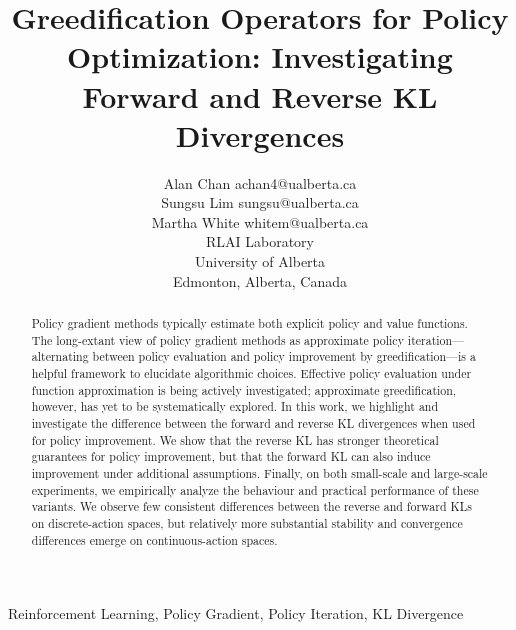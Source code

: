 \documentclass[twoside,11pt]{article}
\begin{document}
\title{Greedification Operators for Policy Optimization: Investigating Forward and Reverse KL Divergences}

\author{\name Alan Chan \email achan4@ualberta.ca \\
        \name Sungsu Lim \email sungsu@ualberta.ca \\
        \name Martha White \email whitem@ualberta.ca \\
       \addr RLAI Laboratory\\
       University of Alberta\\
       Edmonton, Alberta, Canada
       }


\maketitle

\begin{abstract}%
Policy gradient methods typically estimate both explicit policy and value functions. The long-extant view of policy gradient methods as approximate policy iteration---alternating between policy evaluation and policy improvement by greedification---is a helpful framework to elucidate algorithmic choices. Effective policy evaluation under function approximation is being actively investigated; approximate greedification, however, has yet to be systematically explored. 
In this work, we highlight and investigate the difference between the forward and reverse KL divergences when used for policy improvement. We show that the reverse KL has stronger theoretical guarantees for policy improvement, but that the forward KL can also induce improvement under additional assumptions. Finally, on both small-scale and large-scale experiments, we empirically analyze the behaviour and practical performance of these variants. We observe few consistent differences between the reverse and forward KLs on discrete-action spaces, but relatively more substantial stability and convergence differences emerge on continuous-action spaces.
\end{abstract}

\begin{keywords}
  Reinforcement Learning, Policy Gradient, Policy Iteration, KL Divergence
\end{keywords}
\end{document}

